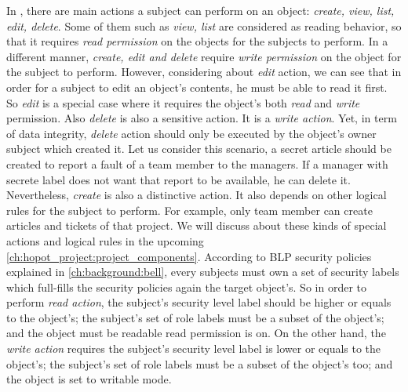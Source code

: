 In \myProject, there are main actions a subject can perform on an object: \emph{create, view, list, edit, delete}.
Some of them such as \emph{view, list} are considered as reading behavior, so that it requires \emph{read permission} on the objects for the subjects to perform.
In a different manner, \emph{create, edit and delete} require \emph{write permission} on the object for the subject to perform.
However, considering about \emph{edit} action, we can see that in order for a subject to edit an object's contents, he must be able to read it first.
So \emph{edit} is a special case where it requires the object's both \emph{read} and \emph{write} permission.
Also \emph{delete} is also a sensitive action.
It is a \emph{write action}.
Yet, in term of data integrity, \emph{delete} action should only be executed by the object's owner \ie subject which created it.
Let us consider this scenario, a secret article should be created to report a fault of a team member to the managers.
If a manager with secrete label does not want that report to be available, he can delete it.
Nevertheless, \emph{create} is also a distinctive action.
It also depends on other logical rules for the subject to perform.
For example, only team member can create articles and tickets of that project.
We will discuss about these kinds of special actions and logical rules in the upcoming \autoref{ch:hopot_project:project_components}.
According to BLP security policies explained in \autoref{ch:background:bell}, every subjects must own a set of security labels which full-fills the security policies again the target object's.
So in order to perform \emph{read action}, the subject's security level label should be higher or equals to the object's;
the subject's set of role labels must be a subset of the object's;
and the object must be readable \ie read permission is on.
On the other hand, the \emph{write action} requires the subject's security level label is lower or equals to the object's;
the subject's set of role labels must be a subset of the object's too;
and the object is set to writable mode.


